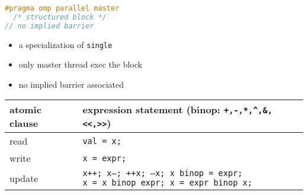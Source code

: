 \documentclass[8pt,a4paper,landscape]{extarticle}
\begin{document}
\begin{multicols*}{3}
\begin{minipage}{0.5\linewidth}
\end{minipage}
\begin{minipage}{0.5\linewidth}
\begin{lstlisting}[language=C,xrightmargin=2pt]
#pragma omp parallel master
  /* structured block */
// no implied barrier
\end{lstlisting}
\end{minipage}
\begin{minipage}{0.5\linewidth}
  \flushleft
  \begin{itemize}
  \item a specialization of \texttt{single}
  \item only master thread exec the block
  \item no implied barrier associated
\end{itemize}
\end{minipage}
\begin{tabular}{l|l}
  \hline
  atomic clause & expression statement (binop: \verb|+,-,*,^,&,<<,>>|) \\
  \hline
  read    & \texttt{val = x;}  \\
  write   & \texttt{x = expr;} \\
  update  & \parbox[t]{6.8cm}{\texttt{x++; x--; ++x; --x; x binop = expr;}\\ \texttt{x = x binop expr; x = expr binop x;}}\\
  \hline
  \\
  \hline
\end{tabular}

\end{multicols*}
\end{document}
